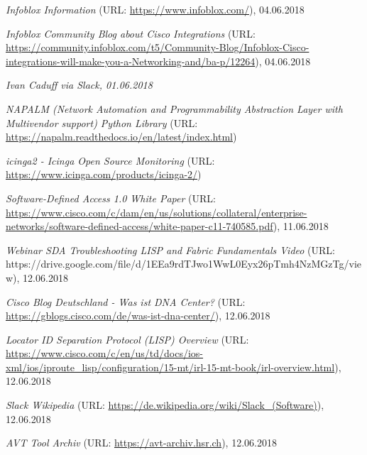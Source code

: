 \begin{thebibliography}{}
	 \textit{Infoblox Information} (URL: \url{https://www.infoblox.com/}), 04.06.2018
	
	 \textit{Infoblox Community Blog about Cisco Integrations} (URL: \url{https://community.infoblox.com/t5/Community-Blog/Infoblox-Cisco-integrations-will-make-you-a-Networking-and/ba-p/12264}), 04.06.2018
	
	 \textit{Ivan Caduff via Slack, 01.06.2018}
	
	 \textit{NAPALM (Network Automation and Programmability Abstraction Layer with Multivendor support) Python Library} (URL: \url{https://napalm.readthedocs.io/en/latest/index.html})
	
	 \textit{icinga2 - Icinga Open Source Monitoring} (URL: \url{https://www.icinga.com/products/icinga-2/})
	
	 \textit{Software-Defined Access 1.0 White Paper} (URL: \url{https://www.cisco.com/c/dam/en/us/solutions/collateral/enterprise-networks/software-defined-access/white-paper-c11-740585.pdf}), 11.06.2018
	
	 \textit{Webinar SDA Troubleshooting LISP and Fabric Fundamentals Video} (URL: https://drive.google.com/file/d/1EEa9rdTJwo1WwL0Eyx26pTmh4NzMGzTg/view), 12.06.2018
	
	 \textit{Cisco Blog Deutschland - Was ist DNA Center?} (URL: \url{https://gblogs.cisco.com/de/was-ist-dna-center/}), 12.06.2018
	
	 \textit{Locator ID Separation Protocol (LISP) Overview} (URL: \url{https://www.cisco.com/c/en/us/td/docs/ios-xml/ios/iproute\_lisp/configuration/15-mt/irl-15-mt-book/irl-overview.html}), 12.06.2018
	
	 \textit{Slack Wikipedia} (URL: \url{https://de.wikipedia.org/wiki/Slack\_(Software)}), 12.06.2018
	
	 \textit{AVT Tool Archiv} (URL: \url{https://avt-archiv.hsr.ch}), 12.06.2018
	
\end{thebibliography}
